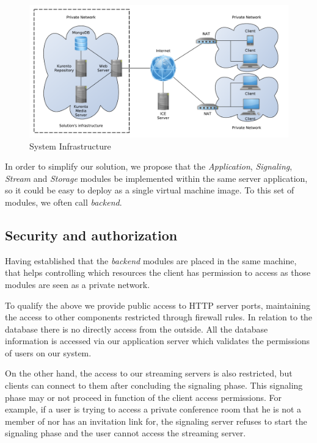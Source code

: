 \begin{figure}[H]
	\centering
	\includegraphics[width=\textwidth]{figures/infrastructure.pdf}
	\caption{System Infrastructure}
\end{figure}

In order to simplify our solution, we propose that the \emph{Application}, \emph{Signaling}, \emph{Stream} and \emph{Storage} modules be implemented within the same server application, so it could be easy to deploy as a single virtual machine image. To this set of modules, we often call \emph{backend}.

	\subsection{Security and authorization}

Having established that the \emph{backend} modules are placed in the same machine, that helps controlling which resources the client has permission to access as those modules are seen as a private network.

To qualify the above we provide public access to \ac{HTTP} server ports, maintaining the access to other components restricted through firewall rules.
In relation to the database there is no directly access from the outside. All the database information is accessed via our application server which validates the permissions of users on our system.

On the other hand, the access to our streaming servers is also restricted, but clients can connect to them after concluding the signaling phase. This signaling phase may or not proceed in function of the client access permissions. For example, if a user is trying to access a private conference room that he is not a member of nor has an invitation link for, the signaling server refuses to start the signaling phase and the user cannot access the streaming server.

